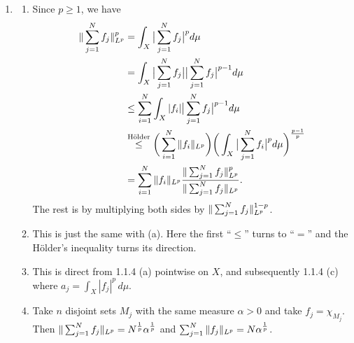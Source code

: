 \begin{enumerate}
\item[1.1.5.]
    \begin{enumerate}
    \item[(a)] Since $p \geq 1$, we have
    \begin{equation*}\begin{aligned}
    \Vert \sum_{j=1}^{N}f_{j} \Vert_{L^p}^{p} &= \int_{X}\big|\sum_{j=1}^{N}f_{j}\big|^{p}d\mu \\
    &= \int_{X}\big|\sum_{j=1}^{N}f_{j}\big|\big|\sum_{j=1}^{N}f_{j}\big|^{p-1}d\mu \\
    &\leq \sum_{i=1}^{N}\int_{X}|f_{i}|\big|\sum_{j=1}^{N}f_{j}\big|^{p-1}d\mu\\
    &\overset{\text{Hölder}}{\leq} \bigg(\sum_{i=1}^{N}\Vert f_{i} \Vert_{L^p}\bigg)
    \bigg(\int_{X}\big|\sum_{j=1}^{N}f_{i}\big|^{p}d\mu\bigg)^{\frac{p-1}{p}}\\
    &= \sum_{i=1}^{N}\Vert f_{i} \Vert_{L^p}\frac{\Vert \sum_{j=1}^{N}f_{j} \Vert_{L^p}^{p}}{\Vert \sum_{j=1}^{N}f_{j} \Vert_{L^p}}. 
    \end{aligned}\end{equation*}
    The rest is by multiplying both sides by $\Vert \sum_{j=1}^{N}f_{j} \Vert_{L^p}^{1-p}$.
    
    \item[(b)] This is just the same with (a). Here the first ``$\leq$'' 
    turns to ``$=$'' and the Hölder's inequality turns its direction.
    
    \item[(c)] This is direct from 1.1.4 (a) pointwise on $X$, and 
    subsequently 1.1.4 (c) where $a_{j}=\displaystyle{\int_{X}|f_{j}|^{p}\,d\mu}$.
    
    \item[(d)] Take $n$ disjoint sets $M_{j}$ 
    with the same measure $\alpha>0$ and take $f_{j}=\chi_{M_{j}}$. 
    Then $\Vert \sum_{j=1}^{N}f_{j} \Vert_{L^p}=N^\frac{1}{p}\alpha^\frac{1}{p}$ 
    and $\sum_{j=1}^{N}\Vert f_{j} \Vert_{L^p}=N\alpha^\frac{1}{p}$.
    \end{enumerate}


\end{enumerate}
